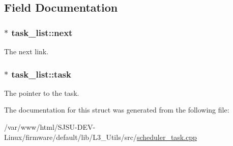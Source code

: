 \subsection{Field Documentation}
\subsubsection[{\texorpdfstring{next}{next}}]{$\ast$ task\+\_\+list\+::next}\hypertarget{structtask__list_a0f53cc75acee38343f59004b332bb37c}{}\label{structtask__list_a0f53cc75acee38343f59004b332bb37c}


The next link. 

\subsubsection[{\texorpdfstring{task}{task}}]{$\ast$ task\+\_\+list\+::task}\hypertarget{structtask__list_a9ff1e9ce16085edc541eca8a6855c2ea}{}\label{structtask__list_a9ff1e9ce16085edc541eca8a6855c2ea}


The pointer to the task. 



The documentation for this struct was generated from the following file\+:\begin{DoxyCompactItemize}
\item 
/var/www/html/\+S\+J\+S\+U-\/\+D\+E\+V-\/\+Linux/firmware/default/lib/\+L3\+\_\+\+Utils/src/\hyperlink{scheduler__task_8cpp}{scheduler\+\_\+task.\+cpp}\end{DoxyCompactItemize}

